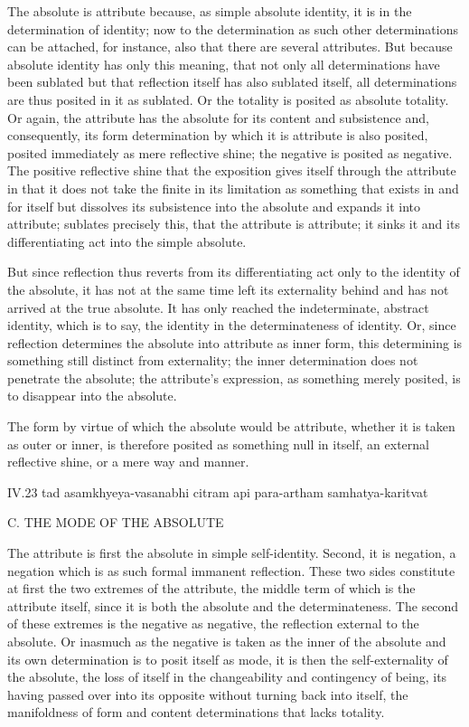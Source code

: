 The absolute is attribute because,
as simple absolute identity,
it is in the determination of identity;
now to the determination as such
other determinations can be attached,
for instance, also that there are several attributes.
But because absolute identity has only this meaning,
that not only all determinations have been sublated
but that reflection itself has also sublated itself,
all determinations are thus posited in it as sublated.
Or the totality is posited as absolute totality.
Or again, the attribute has the absolute
for its content and subsistence
and, consequently, its form determination
by which it is attribute is also posited,
posited immediately as mere reflective shine;
the negative is posited as negative.
The positive reflective shine that
the exposition gives itself through the attribute
in that it does not take the finite in its limitation as
something that exists in and for itself
but dissolves its subsistence into the absolute
and expands it into attribute;
sublates precisely this, that the attribute is attribute;
it sinks it and its differentiating act
into the simple absolute.

But since reflection thus reverts
from its differentiating act
only to the identity of the absolute,
it has not at the same time
left its externality behind
and has not arrived at the true absolute.
It has only reached the
indeterminate, abstract identity,
which is to say, the identity
in the determinateness of identity.
Or, since reflection determines the
absolute into attribute as inner form,
this determining is something
still distinct from externality;
the inner determination does not
penetrate the absolute;
the attribute's expression,
as something merely posited,
is to disappear into the absolute.

The form by virtue of which
the absolute would be attribute,
whether it is taken as outer or inner,
is therefore posited as something null in itself,
an external reflective shine,
or a mere way and manner.

IV.23
tad asamkhyeya-vasanabhi citram api para-artham samhatya-karitvat

C. THE MODE OF THE ABSOLUTE

The attribute is first
the absolute in simple self-identity.
Second, it is negation,
a negation which is as such
formal immanent reflection.
These two sides constitute at first
the two extremes of the attribute,
the middle term of which is the attribute itself,
since it is both the absolute and the determinateness.
The second of these extremes is the negative as negative,
the reflection external to the absolute.
Or inasmuch as the negative is
taken as the inner of the absolute
and its own determination is to posit itself as mode,
it is then the self-externality of the absolute,
the loss of itself in the
changeability and contingency of being,
its having passed over into its opposite
without turning back into itself,
the manifoldness of form and content
determinations that lacks totality.

